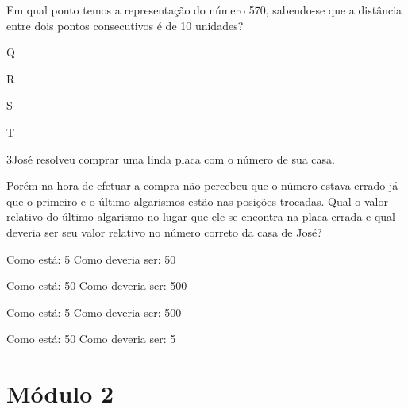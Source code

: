 
Em qual ponto temos a representação do número 570, sabendo-se que a
distância entre dois pontos consecutivos é de 10 unidades?

\begin{escolha}
\item
  Q
\item
  R
\item
  S
\item
  T
\end{escolha}


\num{3}José resolveu comprar uma linda placa com o número de sua casa.


Porém na hora de efetuar a compra não percebeu que o número estava
errado já que o primeiro e o último algarismos estão nas posições
trocadas. Qual o valor relativo do último algarismo no lugar que ele se
encontra na placa errada e qual deveria ser seu valor relativo no número
correto da casa de José?

\begin{escolha}
\item
  Como está: 5 Como deveria ser: 50
\item
  Como está: 50 Como deveria ser: 500
\item
  Como está: 5 Como deveria ser: 500
\item
  Como está: 50 Como deveria ser: 5
\end{escolha}


\chapter{Módulo 2}

